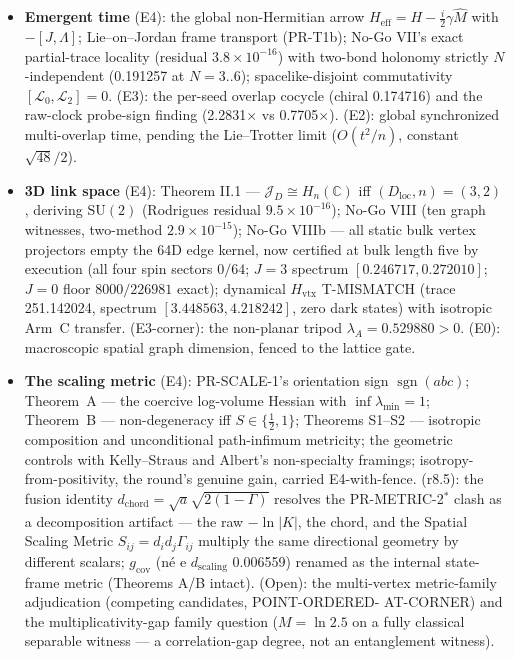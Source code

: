 \documentclass[11pt,a4paper]{article}
\theoremstyle{definition}
\begin{document}
\begin{itemize}[leftmargin=1.4em]
\item \textbf{Emergent time} (E4): the global non-Hermitian arrow
$H_{\mathrm{eff}} = H - \tfrac{i}{2}\gamma\hat M$ with $-[J,
\Lambda]$; Lie--on--Jordan frame transport (PR-T1b); No-Go VII's
exact partial-trace locality (residual $3.8\times10^{-16}$) with
two-bond holonomy strictly $N$-independent (0.191257 at
$N{=}3..6$); spacelike-disjoint commutativity $[\mathcal L_0,
\mathcal L_2] = 0$. (E3): the per-seed overlap cocycle (chiral
0.174716) and the raw-clock probe-sign finding (2.2831$\times$ vs
0.7705$\times$). (E2): global synchronized multi-overlap time,
pending the Lie--Trotter limit ($O(t^2/n)$, constant
$\sqrt{48}/2$).
\item \textbf{3D link space} (E4): Theorem II.1 ---
$\mathcal J_D \cong H_n(\mathbb C)$ iff $(D_{\mathrm{loc}},
n) = (3,2)$, deriving $\mathrm{SU}(2)$ (Rodrigues residual
$9.5\times10^{-16}$); No-Go VIII (ten graph witnesses, two-method
$2.9\times10^{-15}$); No-Go VIIIb --- all static bulk vertex
projectors empty the 64D edge kernel, now certified at bulk length
five by execution (all four spin sectors $0/64$; $J{=}3$ spectrum
$[0.246717, 0.272010]$; $J{=}0$ floor $8000/226981$ exact);
dynamical $H_{\mathrm{vtx}}$ T-MISMATCH (trace 251.142024,
spectrum $[3.448563, 4.218242]$, zero dark states) with
isotropic Arm~C transfer. (E3-corner): the non-planar tripod
$\lambda_A = 0.529880 > 0$. (E0): macroscopic spatial graph
dimension, fenced to the lattice gate.
\item \textbf{The scaling metric} (E4): PR-SCALE-1's orientation
sign $\operatorname{sgn}(abc)$; Theorem~A --- the coercive
log-volume Hessian with $\inf\lambda_{\min} = 1$; Theorem~B ---
non-degeneracy iff $S \in \{\tfrac12, 1\}$; Theorems S1--S2 ---
isotropic composition and unconditional path-infimum metricity;
the geometric controls with Kelly--Straus and Albert's
non-specialty framings; isotropy-from-positivity, the round's
genuine gain, carried E4-with-fence. (r8.5): the fusion identity
$d_{\mathrm{chord}} = \sqrt{a}\sqrt{2(1-\Gamma)}$ resolves the
PR-METRIC-2$^\ast$ clash as a decomposition artifact --- the raw
$-\ln|K|$, the chord, and the Spatial Scaling Metric
$S_{ij} = d_i d_j \Gamma_{ij}$ multiply the same directional
geometry by different scalars; $g_{\mathrm{cov}}$ (n\'e e
$d_{\mathrm{scaling}}$ 0.006559) renamed as the internal
state-frame metric (Theorems A/B intact). (Open): the multi-vertex
metric-family adjudication (competing candidates, POINT-ORDERED-
AT-CORNER) and the multiplicativity-gap family question
($M = \ln 2.5$ on a fully classical separable witness --- a
correlation-gap degree, not an entanglement witness).
\end{itemize}
\end{document}
